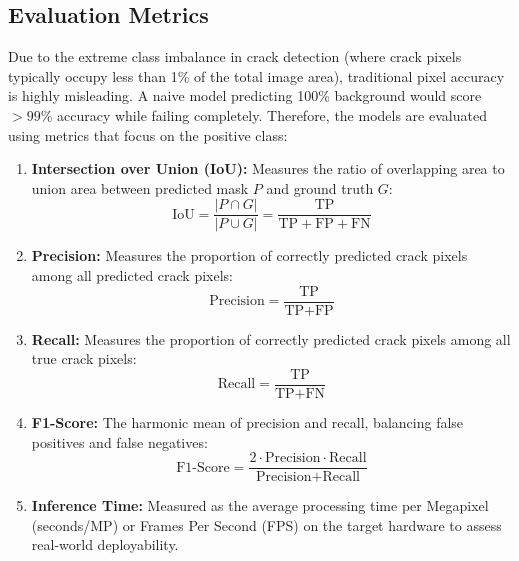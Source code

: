 \subsection{Evaluation Metrics}
\label{subsec:evaluation_metrics}
\hs Due to the extreme class imbalance in crack detection (where crack pixels typically occupy less than 1\% of the total image area), traditional pixel accuracy is highly misleading. A naive model predicting 100\% background would score $>99\%$ accuracy while failing completely. Therefore, the models are evaluated using metrics that focus on the positive class:

\begin{enumerate}
    \item \textbf{Intersection over Union (IoU):} Measures the ratio of overlapping area to union area between predicted mask $P$ and ground truth $G$:
          \begin{equation}
              \text{IoU} = \frac{|P \cap G|}{|P \cup G|} = \frac{\text{TP}}{\text{TP} + \text{FP} + \text{FN}}
          \end{equation}
    \item \textbf{Precision:} Measures the proportion of correctly predicted crack pixels among all predicted crack pixels:
          \begin{equation}
              \text{Precision} = \frac{\text{TP}}{\text{TP} + \text{FP}}
          \end{equation}
    \item \textbf{Recall:} Measures the proportion of correctly predicted crack pixels among all true crack pixels:
          \begin{equation}
              \text{Recall} = \frac{\text{TP}}{\text{TP} + \text{FN}}
          \end{equation}
    \item \textbf{F1-Score:} The harmonic mean of precision and recall, balancing false positives and false negatives:
          \begin{equation}
              \text{F1-Score} = \frac{2 \cdot \text{Precision} \cdot \text{Recall}}{\text{Precision} + \text{Recall}}
          \end{equation}
    \item \textbf{Inference Time:} Measured as the average processing time per Megapixel (seconds/MP) or Frames Per Second (FPS) on the target hardware to assess real-world deployability.
\end{enumerate}

\newpage

